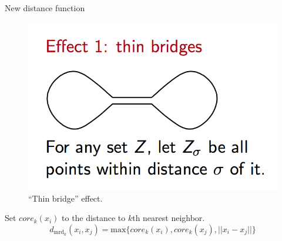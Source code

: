 \documentclass{beamer}
\begin{document}
\begin{frame}{New distance function}

\begin{figure}[h!]
	\centering
	\includegraphics[scale=0.35]{a.png}
	\caption{``Thin bridge'' effect.}
	\label{fig:slabfig}
\end{figure}

\begin{definition}
	Set $core_k(x_i)$ to the distance to $k$th nearest neighbor.
	$$d_{\mathrm{mrd}_k}(x_i, x_j) = \text{max}\{core_k(x_i), core_k(x_j), ||x_i - x_j||\}$$
\end{definition}

\end{frame}
\end{document}
